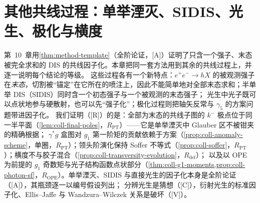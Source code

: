 \chapter{其他共线过程：单举湮灭、SIDIS、光生、极化与横度}\label{ch:coll}

第~10~章用\cref{thm:method-template}（全阶论证，[A]）证明了只含一个强子、末态被完全求和的 DIS 的共线因子化。本章把同一套方法用到其余的共线过程上，并逐一说明每个结论的等级。
这些过程各有一个新特点：$e^+e^-\to hX$ 的被观测强子在\emph{末态}，切割被“锚定”在它所在的喷注上，因此不能简单地对全部末态求和；半单举 DIS（SIDIS）同时含一个初态强子与一个被观测的末态强子；
光生中光子既可以点状地参与硬散射，也可以先“强子化”；极化过程则把轴矢反常与 $\gamma_5$ 的方案问题带进因子化。
我们证明（[R]）的是：全部为末态的共线子图的 $k^-$ 极点位于同一半平面（\cref{lem:coll-final-poles}，$R_{\mathrm{PT}}$）——它是单举湮灭中 Glauber 区不被钳夹的精确根据；
$\gamma^*g$ 盒图对 $g_1$ 第一阶矩的贡献依赖于方案（\cref{prop:coll-anomaly-scheme}，单圈，$R_{\mathrm{PT}}$）；领头阶演化保持 Soffer 不等式（\cref{prop:coll-soffer}，$R_{\mathrm{PT}}$）；横度不与胶子混合（\cref{prop:coll-transversity-evolution}，$R_{\mathrm{def}}$）；
以及以 OPE 为前提的 $g_1$ 奇数矩与光子结构函数点状部分（\cref{thm:coll-g1-moments,prop:coll-photon-sf}，$R_{\mathrm{OPE}}$）。单举湮灭、SIDIS 与直接光生的因子化本身是全阶论证（[A]），其瓶颈逐一以编号假设列出；
分辨光生是猜想（[C]），衍射光生的标准因子化、Ellis--Jaffe 与 Wandzura--Wilczek 关系是破坏（[V]）。

